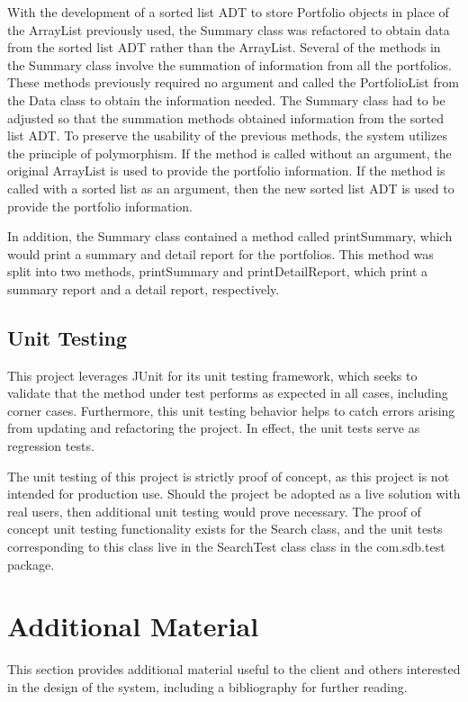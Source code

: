 \documentclass[12pt]{scrartcl} %
\begin{document}
    With the development of a sorted list ADT to store Portfolio objects in place of the ArrayList previously used, the Summary class was refactored to obtain data from the sorted list ADT rather than the ArrayList.  Several of the methods in the Summary class involve the summation of information from all the portfolios.  These methods previously required no argument and called the PortfolioList from the Data class to obtain the information needed.  The Summary class had to be adjusted so that the summation methods obtained information from the sorted list ADT.  To preserve the usability of the previous methods, the system utilizes the principle of polymorphism.  If the method is called without an argument, the original ArrayList is used to provide the portfolio information.  If the method is called with a sorted list as an argument, then the new sorted list ADT is used to provide the portfolio information.

    In addition, the Summary class contained a method called printSummary, which would print a summary and detail report for the portfolios.  This method was split into two methods, printSummary and printDetailReport, which print a summary report and a detail report, respectively.

    \subsection{Unit Testing}

    This project leverages JUnit for its unit testing framework, which seeks to validate that the method under test performs as expected in all cases, including corner cases. Furthermore, this unit testing behavior helps to catch errors arising from updating and refactoring the project. In effect, the unit tests serve as regression tests.

    The unit testing of this project is strictly proof of concept, as this project is not intended for production use. Should the project be adopted as a live solution with real users, then additional unit testing would prove necessary. The proof of concept unit testing functionality exists for the Search class, and the unit tests corresponding to this class live in the SearchTest class class in the com.sdb.test package.

    \section{Additional Material}

    This section provides additional material useful to the client and others interested in the design of the system, including a bibliography for further reading.
\end{document}
